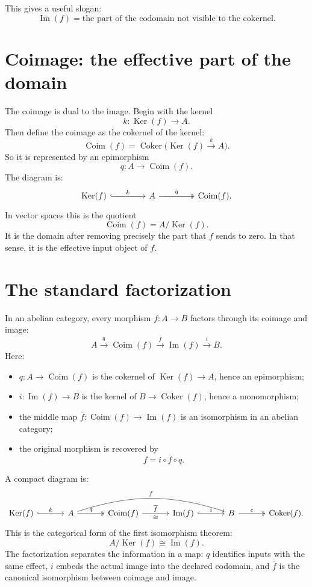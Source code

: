 This gives a useful slogan:
\[
  \operatorname{Im}(f)=\text{the part of the codomain not visible to the cokernel.}
\]

\section{Coimage: the effective part of the domain}

The coimage is dual to the image.  Begin with the kernel
\[
  k:\operatorname{Ker}(f)\to A.
\]
Then define the coimage as the cokernel of the kernel:
\[
  \operatorname{Coim}(f)=\operatorname{Coker}\bigl(\operatorname{Ker}(f)\xrightarrow{k}A\bigr).
\]
So it is represented by an epimorphism
\[
  q:A\to \operatorname{Coim}(f).
\]
The diagram is:
\[
\begin{tikzcd}[column sep=4.2em]
\operatorname{Ker}(f) \arrow[r, "k", hook] & A \arrow[r, "q", two heads] & \operatorname{Coim}(f).
\end{tikzcd}
\]
In vector spaces this is the quotient
\[
  \operatorname{Coim}(f)=A/\operatorname{Ker}(f).
\]
It is the domain after removing precisely the part that \(f\) sends to zero.  In that sense, it is the effective input object of \(f\).

\section{The standard factorization}

In an abelian category, every morphism \(f:A\to B\) factors through its coimage and image:
\[
  A \xrightarrow{q} \operatorname{Coim}(f)
  \xrightarrow{\overline f}
  \operatorname{Im}(f)
  \xrightarrow{i} B.
\]
Here:
\begin{itemize}
  \item \(q:A\to \operatorname{Coim}(f)\) is the cokernel of \(\operatorname{Ker}(f)\to A\), hence an epimorphism;
  \item \(i:\operatorname{Im}(f)\to B\) is the kernel of \(B\to \operatorname{Coker}(f)\), hence a monomorphism;
  \item the middle map \(\overline f:\operatorname{Coim}(f)\to \operatorname{Im}(f)\) is an isomorphism in an abelian category;
  \item the original morphism is recovered by
  \[
    f=i\circ \overline f\circ q.
  \]
\end{itemize}
A compact diagram is:
\[
\begin{tikzcd}[column sep=3.3em,row sep=3.2em]
\operatorname{Ker}(f) \arrow[r, "k", hook] & A \arrow[r, "q", two heads] \arrow[rrr, bend left=18, "f"] & \operatorname{Coim}(f) \arrow[r, "\overline f", "\cong"'] & \operatorname{Im}(f) \arrow[r, "i", hook] & B \arrow[r, "c", two heads] & \operatorname{Coker}(f).
\end{tikzcd}
\]
This is the categorical form of the first isomorphism theorem:
\[
  A/\operatorname{Ker}(f)\cong \operatorname{Im}(f).
\]
The factorization separates the information in a map: \(q\) identifies inputs with the same effect, \(i\) embeds the actual image into the declared codomain, and \(\overline f\) is the canonical isomorphism between coimage and image.

